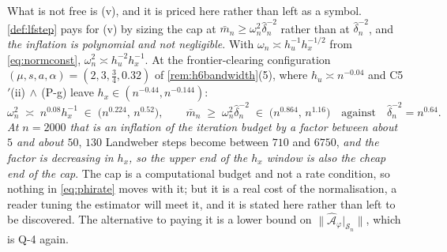 \begin{lemma}
What is not free is (v), and it is priced here rather than left as a symbol.
\cref{def:lfstep} pays for (v) by sizing the cap at $\bar m_n\ge\omega_n^{2}\hat\delta_n^{-2}$
rather than at $\hat\delta_n^{-2}$, and \emph{the inflation is polynomial and not negligible}. With
$\omega_n\asymp h_u^{-1}h_x^{-1/2}$ from \eqref{eq:normconst}, $\omega_n^{2}\asymp h_u^{-2}h_x^{-1}$.
At the frontier-clearing configuration $(\mu,s,a,\alpha)=(2,3,\tfrac34,0.32)$ of
\cref{rem:h6bandwidth}(5), where $h_u\asymp n^{-0.04}$ and C5$'$(ii)$\,\wedge\,$(P-g) leave
$h_x\in(n^{-0.44},n^{-0.144})$:
\[
\omega_n^{2}\;\asymp\;n^{0.08}h_x^{-1}\;\in\;\big(n^{0.224},\,n^{0.52}\big),
\qquad
\bar m_n\;\ge\;\omega_n^{2}\hat\delta_n^{-2}\;\in\;\big(n^{0.864},\,n^{1.16}\big)
\quad\text{against}\quad
\hat\delta_n^{-2}=n^{0.64} .
\]
\emph{At $n=2000$ that is an inflation of the iteration budget by a factor between about $5$ and about
$50$}, $130$ Landweber steps become between $710$ and $6750$, \emph{and the factor is decreasing in
$h_x$, so the upper end of the $h_x$ window is also the cheap end of the cap}. The cap is a computational
budget and not a rate condition, so nothing in \eqref{eq:phirate} moves with it; but it is a real cost of
the normalisation, a reader tuning the estimator will meet it, and it is stated here rather than left to
be discovered. The alternative to paying it is a lower bound on
$\|\hat{\mathcal A}_\varphi\vert_{\mathcal S_n}\|$, which is Q-4 again.
\end{lemma}

